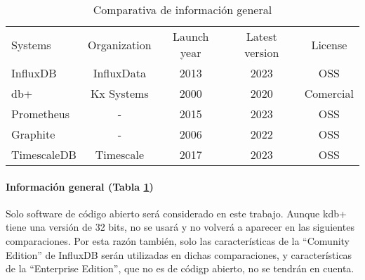 \begin{table}[H]
    \begin{center}
        \begin{adjustbox}{max width=\textwidth}
            \begin{tabular}{l c c c c}
                \toprule
                Systems & Organization & Launch year & Latest version & License \\
                \otoprule
                InfluxDB    & InfluxData & 2013 & 2023 & OSS \\
                db+        & Kx Systems & 2000 & 2020 & Comercial \\
                Prometheus  & -          & 2015 & 2023 & OSS \\
                Graphite    & -          & 2006 & 2022 & OSS \\
                TimescaleDB & Timescale  & 2017 & 2023 & OSS \\
                \bottomrule
            \end{tabular}
        \end{adjustbox}
        \caption{Comparativa de información general}
        \label{tabla:gisgbd}
    \end{center}
\end{table}

\paragraph*{Información general (Tabla \ref*{tabla:gisgbd})} Solo software de código abierto será considerado en este
trabajo. Aunque kdb+ tiene una versión de 32 bits, no se usará y no volverá a aparecer en las siguientes comparaciones.
Por esta razón también, solo las características de la ``Comunity Edition'' de InfluxDB serán utilizadas en dichas
comparaciones, y características de la ``Enterprise Edition'', que no es de códigp abierto, no se tendrán en cuenta.

